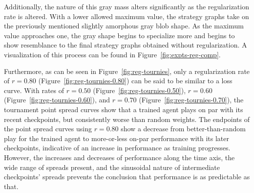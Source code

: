 Additionally,
the nature of this gray mass alters significantly as the regularization rate is
altered.
%
With a lower allowed maximum value,
the strategy graphs take on the previously mentioned slightly amorphous gray
blob shape.
%
As the maximum value approaches one,
the gray shape begins to specialize more and begins to show resemblance to the
final strategy graphs obtained without regularization.
%
A visualization of this process can be found in
Figure~\ref{fig:expts-reg-comp}.



Furthermore,
as can be seen in Figure~\ref{fig:reg-tournies},
only a regularization rate of $r = 0.80$ (Figure~\ref{fig:reg-tournies-0.80})
can be said to be similar to a loss curve.
%
With rates of $r=0.50$ (Figure~\ref{fig:reg-tournies-0.50}),
$r = 0.60$ (Figure~\ref{fig:reg-tournies-0.60}),
and $r = 0.70$ (Figure~\ref{fig:reg-tournies-0.70}),
the tournament point spread curves show that a trained agent plays on par with
its recent checkpoints,
but consistently worse than random weights.
%
The endpoints of the point spread curves using $r = 0.80$
show a decrease from better-than-random play for the trained agent
to more-or-less on-par performance with its later checkpoints,
indicative of an increase in performance as training progresses.
%
However,
the increases and decreases of performance along the time axis,
the wide range of spreads present,
and the sinusoidal nature of intermediate checkpoints' spreads
prevents the conclusion that performance is as predictable as that.

